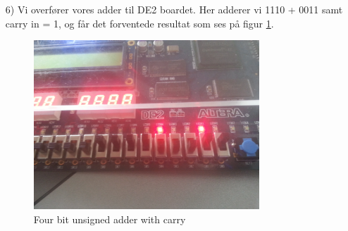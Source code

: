 \begin{enumerate}
	\item[6)]
	Vi overfører vores adder til DE2 boardet. Her adderer vi 1110 + 0011 samt carry in = 1, og får det forventede resultat som ses på figur \ref{fig:4bitUnsignedAdderCarry10100}.
	\begin{figure}[H]
		\centering
		\includegraphics[width=0.8\textwidth]{pictures/Oevelse3/4bit_unsigned_adder_carry2.jpg}
		\caption{Four bit unsigned adder with carry}
		\label{fig:4bitUnsignedAdderCarry10100}
	\end{figure}
	
\end{enumerate}
\newpage
\medskip

